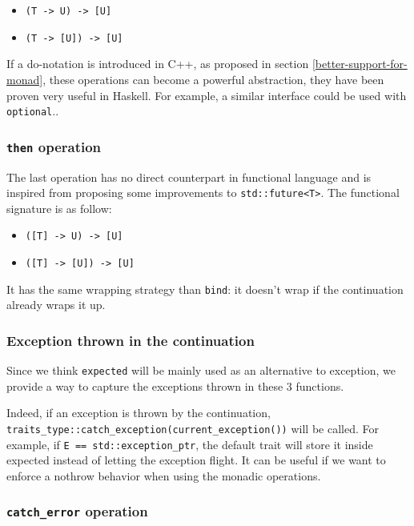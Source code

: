 \documentclass[a4paper,10pt]{article}
\newcommand{\cpp}[1]{\lstinline{#1}}
\begin{document}
\begin{itemize}
\item \cpp{(T -> U) -> [U]}
\item \cpp{(T -> [U]) -> [U]}
\end{itemize}

If a do-notation is introduced in C++, as proposed in section \ref{better-support-for-monad}, these operations can become a powerful abstraction, they have been proven very useful in Haskell. For example, a similar interface could be used with \cpp{optional}..

\subsubsection{\cpp{then} operation}

The last operation has no direct counterpart in functional language and is inspired from \cite{ImprovementsAsync} proposing some improvements to \cpp{std::future<T>}. The functional signature is as follow:

\begin{itemize}
\item \cpp{([T] -> U) -> [U]}
\item \cpp{([T] -> [U]) -> [U]}
\end{itemize}

It has the same wrapping strategy than \cpp{bind}: it doesn't wrap if the continuation already wraps it up.

\subsubsection{Exception thrown in the continuation}

Since we think \cpp{expected} will be mainly used as an alternative to exception, we provide a way to capture the exceptions thrown in these 3 functions. 

Indeed, if an exception is thrown by the continuation, \cpp{traits_type::catch_exception(current_exception())} will be called. For example, if \cpp{E == std::exception_ptr}, the default trait will store it inside expected instead of letting the exception flight. It can be useful if we want to enforce a nothrow behavior when using the monadic operations.

\subsubsection{\cpp{catch_error} operation}
\end{document}
